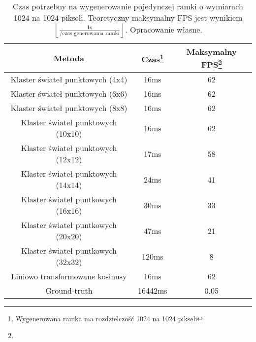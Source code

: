 \documentclass[../main.tex]{subfiles}
\begin{document}
\begin{table}
    \centering
    \begin{tabular}{|c|c|c|}
        \hline
        Metoda & Czas\footnote{Wygenerowana ramka ma rozdzielczość 1024 na 1024 pikseli} & Maksymalny FPS\footnote{} \\ \hline
        Klaster świateł punktowych (4x4) & 16ms & 62 \\ \hline
        Klaster świateł punktowych (6x6) & 16ms & 62 \\ \hline
        Klaster świateł punktowych (8x8) & 16ms & 62 \\ \hline
        Klaster świateł punktowych (10x10) & 16ms & 62 \\ \hline
        Klaster świateł punktowych (12x12) & 17ms & 58 \\ \hline
        Klaster świateł punktowych (14x14) & 24ms & 41 \\ \hline
        Klaster świateł puntkowych (16x16) & 30ms & 33 \\ \hline
        Klaster świateł puntkowych (20x20) & 47ms & 21 \\ \hline
        Klaster świateł puntkowych (32x32) & 120ms & 8 \\ \hline
        Liniowo transformowane kosinusy & 16ms & 62 \\ \hline
        Ground-truth & 16442ms & 0.05 \\
        \hline
    \end{tabular}
    \caption{Czas potrzebny na wygenerowanie pojedynczej ramki o wymiarach 1024 na 1024 pikseli. Teoretyczny maksymalny FPS jest wynikiem $\left \lfloor \frac{1\text{s}}{/\text{czas generowania ramki}}\right \rfloor$. Opracowanie własne.}
    \label{tab:performance}
\end{table}
\end{document}
